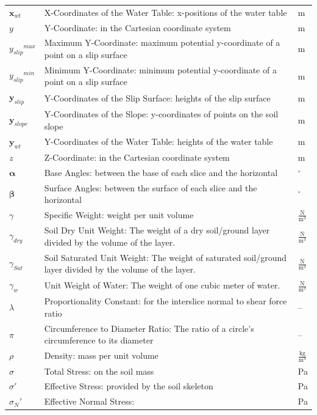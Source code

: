 \documentclass[12pt]{article}
\begin{document}
\begin{longtabu}{l X[l] l}
\\
${\mathbf{x}_{wt}}$ & X-Coordinates of the Water Table: x-positions of the water table & m
\\
$y$ & Y-Coordinate: in the Cartesian coordinate system & m
\\
${{y_{slip}}^{max}}$ & Maximum Y-Coordinate: maximum potential y-coordinate of a point on a slip surface & m
\\
${{y_{slip}}^{min}}$ & Minimum Y-Coordinate: minimum potential y-coordinate of a point on a slip surface & m
\\
${\mathbf{y}_{slip}}$ & Y-Coordinates of the Slip Surface: heights of the slip surface & m
\\
${\mathbf{y}_{slope}}$ & Y-Coordinates of the Slope: y-coordinates of points on the soil slope & m
\\
${\mathbf{y}_{wt}}$ & Y-Coordinates of the Water Table: heights of the water table & m
\\
$z$ & Z-Coordinate: in the Cartesian coordinate system & m
\\
$\mathbf{α}$ & Base Angles: between the base of each slice and the horizontal & ${}^{\circ}$
\\
$\mathbf{β}$ & Surface Angles: between the surface of each slice and the horizontal & ${}^{\circ}$
\\
$γ$ & Specific Weight: weight per unit volume & $\frac{\text{N}}{\text{m}^{3}}$
\\
${γ_{dry}}$ & Soil Dry Unit Weight: The weight of a dry soil/ground layer divided by the volume of the layer. & $\frac{\text{N}}{\text{m}^{3}}$
\\
${γ_{Sat}}$ & Soil Saturated Unit Weight: The weight of saturated soil/ground layer divided by the volume of the layer. & $\frac{\text{N}}{\text{m}^{3}}$
\\
${γ_{w}}$ & Unit Weight of Water: The weight of one cubic meter of water. & $\frac{\text{N}}{\text{m}^{3}}$
\\
$λ$ & Proportionality Constant: for the interslice normal to shear force ratio & --
\\
$π$ & Circumference to Diameter Ratio: The ratio of a circle's circumference to its diameter & --
\\
$ρ$ & Density: mass per unit volume & $\frac{\text{kg}}{\text{m}^{3}}$
\\
$σ$ & Total Stress: on the soil mass & Pa
\\
$σ'$ & Effective Stress: provided by the soil skeleton & Pa
\\
${σ_{N}}'$ & Effective Normal Stress:  & Pa

\end{longtabu}
\end{document}
